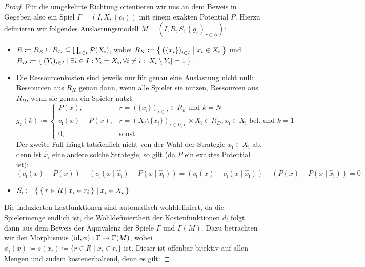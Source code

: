 \begin{proof}
		
	Für die umgekehrte Richtung orientieren wir uns an dem Beweis in \cite[Theorem 1]{MultiPotGames}. Gegeben also ein Spiel $\Gamma = (I, X, (c_i))$ mit einem exakten Potential $P$. Hierzu definieren wir folgendes Auslastungsmodell $M = (I, R, S, (g_r)_{r \in R})$:
	\begin{itemize}
		\item $R \coloneqq R_K \cup R_D \subseteq \prod_{i \in I}\mathcal{P}(X_i)$, wobei $R_K \coloneqq \Set{\left(\{x_i\}\right)_{i \in I} | x_i \in X_i }$ und \\ $R_D \coloneqq \Set{(Y_i)_{i \in I} | \exists \hat{\imath} \in I: Y_{\hat{\imath}} = X_{\hat{\imath}}, \forall i \neq \hat{\imath}: \left|X_i \setminus Y_i\right| = 1 }$.
		\item Die Ressourcenkosten sind jeweils nur für genau eine Auslastung nicht null: Ressourcen aus $R_K$ genau dann, wenn alle Spieler sie nutzen, Ressourcen aus $R_D$, wenn sie genau ein Spieler nutzt:
				\[g_r(k) \coloneqq 
					\begin{cases}
						P(x), 					&r = \left(\{x_i\}\right)_{i \in I} \in R_k 													\text{ und } k=N \\
						c_{\hat{\imath}}(x) - P(x), 	&r = \left(X_i\setminus\{x_i\}\right)_{i \in I\setminus\hat{\imath}} \times X_{\hat{\imath}} \in R_D, x_{\hat{\imath}} \in X_{\hat{\imath}} \text{ bel. und } k=1 \\
						0,						&\text{sonst}
					\end{cases}
				\]
			Der zweite Fall hängt tatsächlich nicht von der Wahl der Strategie $x_{\hat{\imath}} \in X_{\hat{\imath}}$ ab, denn ist $\hat{x}_{\hat{\imath}}$ eine andere solche Strategie, so gilt (da $P$ ein exaktes Potential ist):
			\[\left(c_{\hat{\imath}}(x) - P(x)\right) - \left(c_{\hat{\imath}}(x \mid \hat{x}_{\hat{\imath}}) - P(x \mid \hat{x}_{\hat{\imath}})\right) = \left(c_{\hat{\imath}}(x) - c_{\hat{\imath}}(x \mid \hat{x}_{\hat{\imath}})\right) - \left(P(x) - P(x \mid \hat{x}_{\hat{\imath}})\right) = 0\]
		\item $S_i \coloneqq \Set{ \Set{r \in R | x_i \in r_i} | x_i \in X_i }$
	\end{itemize}
	Die induzierten Lastfunktionen sind automatisch wohldefiniert, da die Spielermenge endlich ist, die Wohldefiniertheit der Kostenfunktionen $d_i$ folgt dann aus dem Beweis der Äquivalenz der Spiele $\Gamma$ und $\Gamma(M)$. Dazu betrachten wir den Morphismus $(\mathrm{id}, \phi): \Gamma \to \Gamma(M)$, wobei $\phi_i(x) \coloneqq s(x_i) \coloneqq \{r \in R \mid x_i \in r_i\}$ ist. Dieser ist offenbar bijektiv auf allen Mengen und zudem kostenerhaltend, denn es gilt:

\end{proof}
